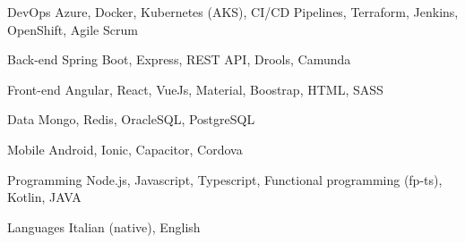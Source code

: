 

\begin{cvskills}

  \cvskill
    {DevOps} %
    {Azure, Docker, Kubernetes (AKS), CI/CD Pipelines, Terraform, Jenkins, OpenShift, Agile Scrum} %

  \cvskill
    {Back-end} %
    {Spring Boot, Express, REST API, Drools, Camunda} %

  \cvskill
    {Front-end} %
    {Angular, React, VueJs, Material, Boostrap, HTML, SASS} %

  \cvskill
    {Data} %
    {Mongo, Redis, OracleSQL, PostgreSQL} %

  \cvskill
    {Mobile} %
    {Android, Ionic, Capacitor, Cordova} %

  \cvskill
    {Programming} %
    {Node.js, Javascript, Typescript, Functional programming (fp-ts), Kotlin, JAVA} %

  \cvskill
    {Languages} %
    {Italian (native), English} %

\end{cvskills}
